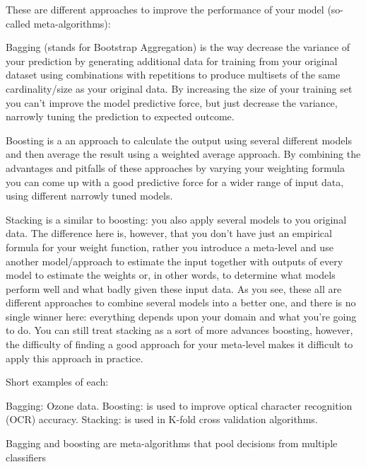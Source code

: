 These are different approaches to improve the performance of your model (so-called meta-algorithms):

Bagging (stands for Bootstrap Aggregation) is the way decrease the variance of your prediction by generating additional data for training from your original dataset using combinations with repetitions to produce multisets of the same cardinality/size as your original data. By increasing the size of your training set you can't improve the model predictive force, but just decrease the variance, narrowly tuning the prediction to expected outcome.

Boosting is a an approach to calculate the output using several different models and then average the result using a weighted average approach. By combining the advantages and pitfalls of these approaches by varying your weighting formula you can come up with a good predictive force for a wider range of input data, using different narrowly tuned models.

Stacking is a similar to boosting: you also apply several models to you original data. The difference here is, however, that you don't have just an empirical formula for your weight function, rather you introduce a meta-level and use another model/approach to estimate the input together with outputs of every model to estimate the weights or, in other words, to determine what models perform well and what badly given these input data.
As you see, these all are different approaches to combine several models into a better one, and there is no single winner here: everything depends upon your domain and what you're going to do. You can still treat stacking as a sort of more advances boosting, however, the difficulty of finding a good approach for your meta-level makes it difficult to apply this approach in practice.

Short examples of each:

Bagging: Ozone data.
Boosting: is used to improve optical character recognition (OCR) accuracy.
Stacking: is used in K-fold cross validation algorithms.



Bagging and boosting are meta-algorithms that pool decisions
from multiple classiﬁers


